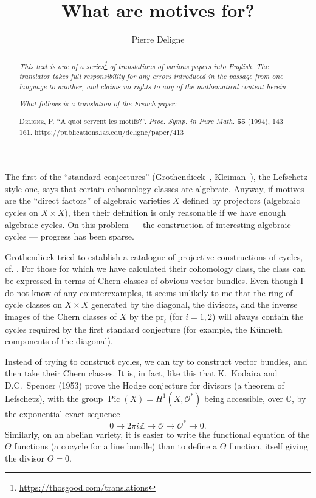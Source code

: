 \documentclass{article}
\title{What are motives for?}
\author{Pierre Deligne}
\date{}
\newcommand{\doctype}{French paper}
\newcommand{\origcit}{%
  \textsc{Deligne, P.}
  ``A quoi servent les motifs?''.
  \emph{Proc. Symp. in Pure Math.} \textbf{55} (1994), 143--161.
  {\url{https://publications.ias.edu/deligne/paper/413}}%
}
\theoremstyle{plain}
\theoremstyle{definition}
\newcommand{\scr}[1]{{\mathscr{#1}}}
\newcommand{\pr}{\mathrm{pr}}
\newcommand{\ZZ}{\mathbb{Z}}
\newcommand{\CC}{\mathbb{C}}
\DeclareMathOperator{\Pic}{Pic}
\newcommand{\oldpage}[1]{\marginpar{\footnotesize$\Big\vert$ \textit{p.~#1}}}
\begin{document}
\maketitle
\thispagestyle{fancy}

\renewcommand{\abstractname}{Translator's note.}

\begin{abstract}
  \renewcommand*{\thefootnote}{\fnsymbol{footnote}}
  \emph{This text is one of a series\footnote{\url{https://thosgood.com/translations}} of translations of various papers into English.}
  \emph{The translator takes full responsibility for any errors introduced in the passage from one language to another, and claims no rights to any of the mathematical content herein.}
  
  \emph{What follows is a translation of the \doctype:}

  \medskip\noindent
  \origcit
\end{abstract}

\setcounter{footnote}{0}

\setcounter{tocdepth}{1}
\tableofcontents
\bigskip



\oldpage{143}
The first of the ``standard conjectures'' (Grothendieck~\cite{19}, Kleiman~\cite{20}), the Lefschetz-style one, says that certain cohomology classes are algebraic.
Anyway, if motives are the ``direct factors'' of algebraic varieties $X$ defined by projectors (algebraic cycles on $X\times X$), then their definition is only reasonable if we have enough algebraic cycles.
On this problem --- the construction of interesting algebraic cycles --- progress has been sparse.

Grothendieck tried to establish a catalogue of projective constructions of cycles, cf. \cite[p.~197]{19}.
For those for which we have calculated their cohomology class, the class can be expressed in terms of Chern classes of obvious vector bundles.
Even though I do not know of any counterexamples, it seems unlikely to me that the ring of cycle classes on $X\times X$ generated by the diagonal, the divisors, and the inverse images of the Chern classes of $X$ by the $\pr_i$ (for $i=1,2$) will always contain the cycles required by the first standard conjecture (for example, the K\"{u}nneth components of the diagonal).

Instead of trying to construct cycles, we can try to construct vector bundles, and then take their Chern classes.
It is, in fact, like this that K.~Kodaira and D.C.~Spencer (1953) prove the Hodge conjecture for divisors (a theorem of Lefschetz), with the group $\Pic(X)=H^1(X,\scr{O}^*)$ being accessible, over $\CC$, by the exponential exact sequence
\[
  0 \to 2\pi i\ZZ \to \scr{O} \to \scr{O}^* \to 0.
\]
Similarly, on an abelian variety, it is easier to write the functional equation of the $\Theta$ functions (a cocycle for a line bundle) than to define a $\Theta$ function, itself giving the divisor $\Theta=0$.
\end{document}
